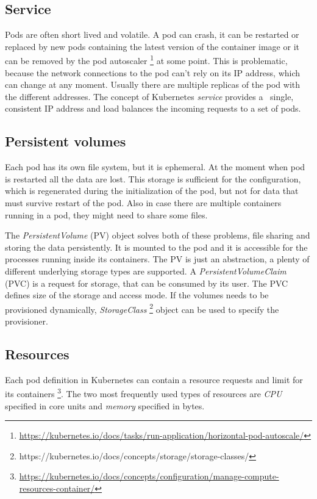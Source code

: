 \documentclass[
  digital, %
  twoside, %
  table,   %
  lof,     %
  lot,     %
]{fithesis3}
\begin{document}
\subsection{Service} \label{sec:service}
Pods are often short lived and volatile. A pod can crash, it can be restarted or replaced by new pods containing the latest version of the container image or it can be removed by the pod autoscaler \footnote{\url{https://kubernetes.io/docs/tasks/run-application/horizontal-pod-autoscale/}} at some point. This is problematic, because the network connections to the pod can't rely on its IP address, which can change at any moment. Usually there are multiple replicas of the pod with the different addresses. The concept of Kubernetes \textit{service} provides a \
single, consistent IP address and load balances the incoming requests to a set of pods.

\subsection{Persistent volumes} \label{sec:pv}
Each pod has its own file system, but it is ephemeral. At the moment when pod is restarted all the data are lost. This storage is sufficient for the configuration, which is regenerated during the initialization of the pod, but not for data that must survive restart of the pod. Also in case there are multiple containers running in a pod, they might need to share some files.

The \textit{PersistentVolume} (PV) object solves both of these problems, file sharing and storing the data persistently. It is mounted to the pod and it is accessible for the processes running inside its containers. The PV is just an abstraction, a plenty of different underlying storage types are supported. A \textit{PersistentVolumeClaim} (PVC) is a request for storage, that can be consumed by its user. The PVC defines size of the storage and access mode. If the volumes needs to be provisioned dynamically, \textit{StorageClass} \footnote{https://kubernetes.io/docs/concepts/storage/storage-classes/} object can be used to specify the provisioner.

\subsection{Resources} \label{sec:resources}
Each pod definition in Kubernetes can contain a resource requests and limit for its containers \footnote{\url{https://kubernetes.io/docs/concepts/configuration/manage-compute-resources-container/}}. The two most frequently used types of resources are \textit{CPU} specified in core units and \textit{memory} specified in bytes.
\end{document}
